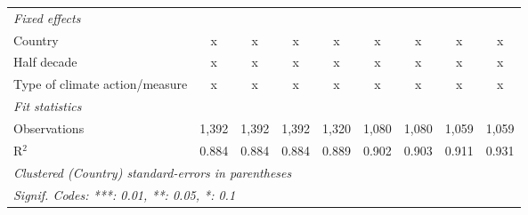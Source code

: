 \begin{table}[htbp]
\begin{tabular}{lcccccccc}
      \emph{Fixed effects}\\
      Country                                                      & x            & x            & x            & x            & x            & x             & x             & x\\  
      Half decade                                                  & x            & x            & x            & x            & x            & x             & x             & x\\  
      Type of climate action/measure                               & x            & x            & x            & x            & x            & x             & x             & x\\  
      \midrule \emph{Fit statistics}\\
      Observations                                                 & 1,392        & 1,392        & 1,392        & 1,320        & 1,080        & 1,080         & 1,059         & 1,059\\  
      R$^2$                                                        & 0.884        & 0.884        & 0.884        & 0.889        & 0.902        & 0.903         & 0.911         & 0.931\\  
      \midrule
      \multicolumn{9}{l}{\emph{Clustered (Country) standard-errors in parentheses}}\\
      \multicolumn{9}{l}{\emph{Signif. Codes: ***: 0.01, **: 0.05, *: 0.1}}\\
   \end{tabular}
\end{table}


